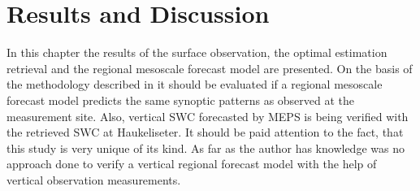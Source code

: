 \chapter{Results and Discussion} \label{ch:Res}
%
In this chapter the results of the surface observation, the optimal estimation retrieval and the regional mesoscale forecast model are presented. On the basis of the methodology described in  it should be evaluated if a regional mesoscale forecast model predicts the same synoptic patterns as observed at the measurement site. Also, vertical SWC forecasted by MEPS is being verified with the retrieved SWC at Haukeliseter. It should be paid attention to the fact, that this study is very unique of its kind. As far as the author has knowledge was no approach done to verify a vertical regional forecast model with the help of vertical observation measurements. 

